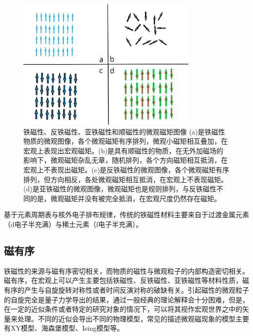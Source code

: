 \begin{figure}[h]
    \centering
\includegraphics[width=0.8\textwidth]{./pic/002.png}
\caption{铁磁性、反铁磁性、亚铁磁性和顺磁性的微观磁矩图像  (a)是铁磁性物质的微观图像，各个微观磁矩有序排列，微观小磁矩相互叠加，在宏观上表现出宏观磁矩。(b)是具有顺磁性的物质，在无外加磁场的影响下，微观磁矩杂乱无章，随机排列，各个方向磁矩相互抵消，在宏观上不表现出磁矩。(c)是反铁磁性的微观图像，各个微观磁矩有序排列，但方向相反，各处微观磁矩相互抵消，在宏观上不表现磁矩。(d)是亚铁磁性的微观图像，微观磁矩也是规则排列，与反铁磁性不同的是，微观磁矩并没有被完全抵消，在宏观尺度仍然存在磁矩。}

\label{dog002}
\end{figure}

基于元素周期表与核外电子排布规律，传统的铁磁性材料主要来自于过渡金属元素（d电子半充满）与稀土元素（f电子半充满）。\cite{hill2000why}

\subsection{磁有序}

铁磁性的来源与磁有序密切相关，而物质的磁性与微观粒子的内部构造密切相关。磁有序，在宏观上可以产生主要包括铁磁性、反铁磁性、亚铁磁性等材料性质，磁有序的产生与自旋旋转对称性或者时间反演对称的破缺有关。引起磁性的微观粒子的自旋完全是量子力学导出的结果，通过一般经典的理论解释会十分困难，但是，在一定的近似条件或者特定的研究对象的情况下，可以将其视作宏观世界之中的矢量来处理。不同的近似会导出不同的物理模型，常见的描述微观磁现象的模型主要有XY模型、海森堡模型、Ising模型等。\cite{dong2019magnetoelectricity}

